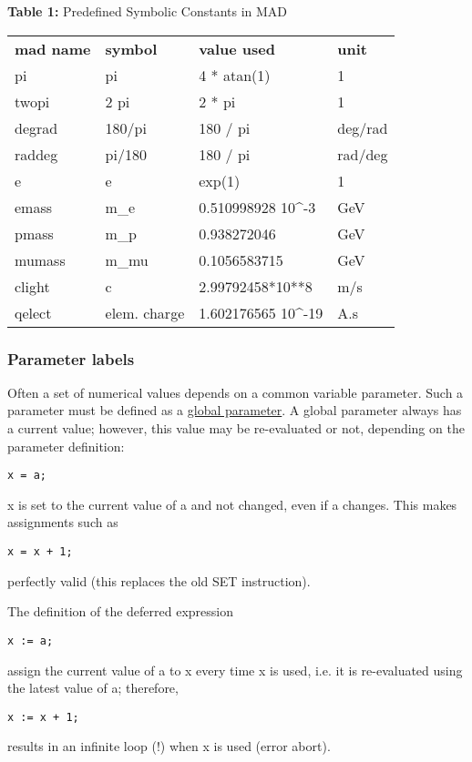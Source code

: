 \begin{table}
\begin{center}
{\textbf{Table 1:} Predefined Symbolic Constants in MAD}
\begin{tabular}{l|l|l|l}
\textbf{mad name} & \textbf{symbol} & \textbf{value used} & \textbf{unit} \\ 
pi & pi & 4 * atan(1) & 1 \\ 
twopi & 2 pi & 2 * pi & 1 \\ 
degrad & 180/pi & 180 / pi & deg/rad \\ 
raddeg & pi/180 & 180 / pi & rad/deg \\ 
e & e & exp(1) & 1 \\ 
emass & m\_e & 0.510998928 10^{-3}& GeV \\ %
pmass & m\_p & 0.938272046 & GeV \\ %
mumass & m\_mu & 0.1056583715 & GeV \\ %
clight & c & 2.99792458*10**8 & m/s \\ 
qelect & elem. charge & 1.602176565 10^{-19} & A.s %
\end{tabular}
\end{center}
\end{table}

\subsubsection{Parameter labels} 
Often a set of numerical values depends on a common variable
parameter. Such a parameter must be defined as a
\href{parameter.html}{global parameter}. A global parameter always has a
current value; however, this value may be re-evaluated or not, depending
on the parameter definition:  
\begin{verbatim}
x = a;
\end{verbatim} 
x is set to the current value of a and not changed, even if a
changes. This makes assignments such as  
\begin{verbatim}
x = x + 1;
\end{verbatim} 
perfectly valid (this replaces the old SET instruction). 

The definition of the deferred expression  
\begin{verbatim}
x := a;
\end{verbatim} 
assign the current value of a to x every time x is used, i.e. it is
re-evaluated using the latest value of a; therefore,  
\begin{verbatim}
x := x + 1;
\end{verbatim} 
results in an infinite loop (!) when x is used (error abort). 

